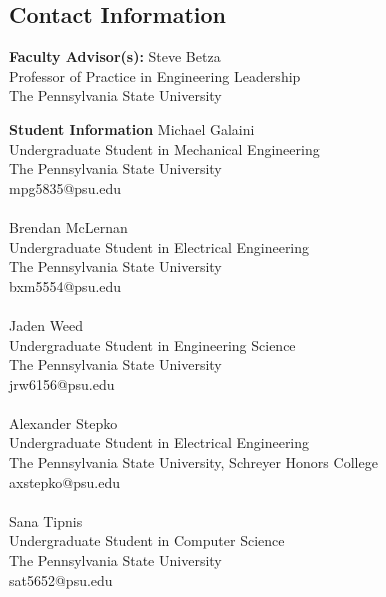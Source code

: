 \documentclass[../main.tex]{subfiles}
\begin{document}
\newpage
\appendixpage
\begin{appendices}
\begin{singlespace}
{\parindent0pt
\section{Contact Information}\label{apxA}
\noindent\textbf{Faculty Advisor(s):}\newline
Steve Betza\\
Professor of Practice in Engineering Leadership\\
The Pennsylvania State University\\
\begin{multicols*}{2}
\noindent\textbf{Student Information}\newline
Michael Galaini\\
Undergraduate Student in Mechanical Engineering\\
The Pennsylvania State University\\
mpg5835@psu.edu
\\~\\
Brendan McLernan\\
Undergraduate Student in Electrical Engineering\\
The Pennsylvania State University\\
bxm5554@psu.edu
\\~\\
Jaden Weed\\
Undergraduate Student in Engineering Science\\
The Pennsylvania State University\\
jrw6156@psu.edu
\columnbreak
\\~\\
Alexander Stepko\\
Undergraduate Student in Electrical Engineering\\
The Pennsylvania State University, Schreyer Honors College\\
axstepko@psu.edu
\\~\\
Sana Tipnis\\
Undergraduate Student in Computer Science\\
The Pennsylvania State University\\
sat5652@psu.edu
\end{multicols*}
}


\end{singlespace}
\end{appendices}
\end{document}

